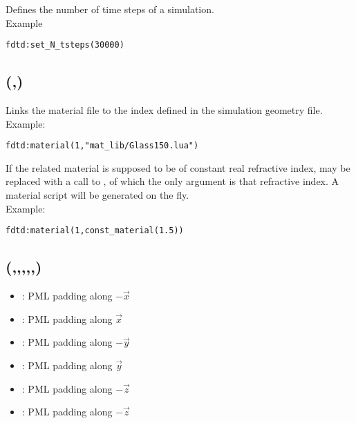 Defines the number of time steps  of a simulation.\\ Example
\begin{lstlisting}
fdtd:set_N_tsteps(30000)
\end{lstlisting}

\subsection[material]{(,)}

\label{fdtd_fc_material}
Links the material file  to the index  defined in the simulation geometry file.\\
	Example:
\begin{lstlisting}
fdtd:material(1,"mat_lib/Glass150.lua")
\end{lstlisting}

If the related material is supposed to be of constant real refractive index,  may be replaced with a call to , of which the only argument is that refractive index. A material script will be generated on the fly.\\
	Example:
\begin{lstlisting}
fdtd:material(1,const_material(1.5))
\end{lstlisting}

%

\subsection[padding]{(,,,,,)}

\fwarn
\begin{itemize}
	\item {}: PML padding along $-\vec x$
	\item {}: PML padding along $\vec x$
	\item {}: PML padding along $-\vec y$
	\item {}: PML padding along $\vec y$
	\item {}: PML padding along $-\vec z$
	\item {}: PML padding along $-\vec z$
\end{itemize}


